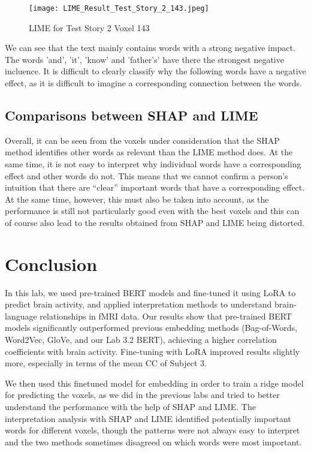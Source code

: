 \documentclass[12pt,letterpaper]{article}
\begin{document}
\begin{figure}[H]
  \centering
  \texttt{[image: LIME\_Result\_Test\_Story\_2\_143.jpeg]}
  \caption{LIME for Test Story 2 Voxel 143}
  \label{fig:LIME1}
\end{figure}

We can see that the text mainly contains words with a strong negative impact. The words 'and', 'it', 'know' and 'father's' have there the strongest negative incluence. It is difficult to clearly classify why the following words have a negative effect, as it is difficult to imagine a corresponding connection between the words.

\subsection{Comparisons between SHAP and LIME}
Overall, it can be seen from the voxels under consideration that the SHAP method identifies other words as relevant than the LIME method does. At the same time, it is not easy to interpret why individual words have a corresponding effect and other words do not. This means that we cannot confirm a person's intuition that there are “clear” important words that have a corresponding effect. At the same time, however, this must also be taken into account, as the performance is still not particularly good even with the best voxels and this can of course also lead to the results obtained from SHAP and LIME being distorted.

\section{Conclusion}

In this lab, we used pre-trained BERT models and fine-tuned it using LoRA to predict brain activity, and applied interpretation methods to understand brain-language relationships in fMRI data. Our results show that pre-trained BERT models significantly outperformed previous embedding methods (Bag-of-Words, Word2Vec, GloVe, and our Lab 3.2 BERT), achieving a higher correlation coefficients with brain activity. Fine-tuning with LoRA improved results slightly more, especially in terms of the mean CC of Subject 3.

We then used this finetuned model for embedding in order to train a ridge model for predicting the voxels, as we did in the previous labs and  tried to better understand the performance with the help of SHAP and LIME. The interpretation analysis with SHAP and LIME identified potentially important words for different voxels, though the patterns were not always easy to interpret and the two methods sometimes disagreed on which words were most important.
\end{document}
